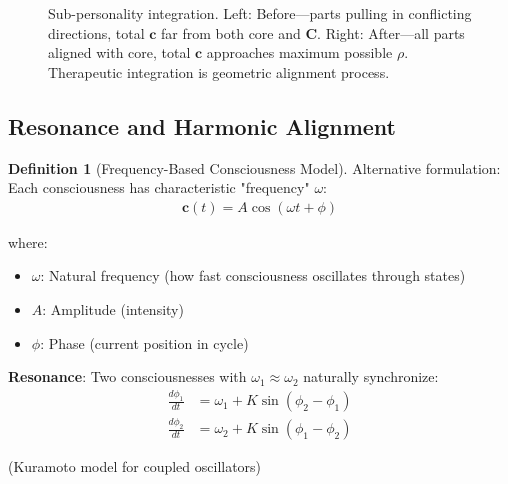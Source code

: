 \documentclass[11pt,a4paper]{article}
\theoremstyle{definition}
\newtheorem{definition}{Definition}[section]
\theoremstyle{remark}
\newcommand{\cc}{\mathbf{c}}
\begin{document}
\begin{small}
\begin{enumerate}
\begin{figure}[H]
\caption{Sub-personality integration. Left: Before—parts pulling in conflicting directions, total \(\cc\) far from both core and \(\mathbf{C}\). Right: After—all parts aligned with core, total \(\cc\) approaches maximum possible \(\rho\). Therapeutic integration is geometric alignment process.}
\label{fig:subpersonality_integration}
\end{figure}

\subsection{Resonance and Harmonic Alignment}

\begin{definition}[Frequency-Based Consciousness Model]
Alternative formulation: Each consciousness has characteristic "frequency" \(\omega\):
\begin{align}
\cc(t) = A \cos(\omega t + \phi)
\end{align}

where:
\begin{itemize}
    \item \(\omega\): Natural frequency (how fast consciousness oscillates through states)
    \item \(A\): Amplitude (intensity)
    \item \(\phi\): Phase (current position in cycle)
\end{itemize}

\textbf{Resonance}: Two consciousnesses with \(\omega_1 \approx \omega_2\) naturally synchronize:
\begin{align}
\frac{d\phi_1}{dt} &= \omega_1 + K\sin(\phi_2 - \phi_1) \\
\frac{d\phi_2}{dt} &= \omega_2 + K\sin(\phi_1 - \phi_2)
\end{align}

(Kuramoto model for coupled oscillators)


\end{definition}
\end{enumerate}
\end{small}
\end{document}
